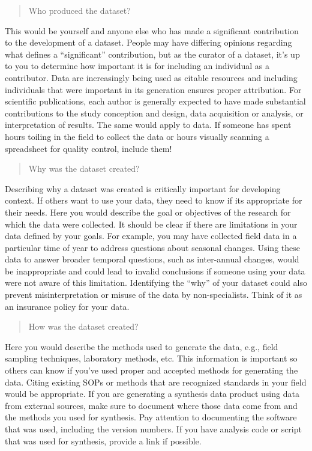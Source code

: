 \documentclass[
]{book}
\begin{document}
\begin{quote}
Who produced the dataset?
\end{quote}

This would be yourself and anyone else who has made a significant contribution to the development of a dataset. People may have differing opinions regarding what defines a ``significant'' contribution, but as the curator of a dataset, it's up to you to determine how important it is for including an individual as a contributor. Data are increasingly being used as citable resources and including individuals that were important in its generation ensures proper attribution. For scientific publications, each author is generally expected to have made substantial contributions to the study conception and design, data acquisition or analysis, or interpretation of results. The same would apply to data. If someone has spent hours toiling in the field to collect the data or hours visually scanning a spreadsheet for quality control, include them!

\begin{quote}
Why was the dataset created?
\end{quote}

Describing why a dataset was created is critically important for developing context. If others want to use your data, they need to know if its appropriate for their needs. Here you would describe the goal or objectives of the research for which the data were collected. It should be clear if there are limitations in your data defined by your goals. For example, you may have collected field data in a particular time of year to address questions about seasonal changes. Using these data to answer broader temporal questions, such as inter-annual changes, would be inappropriate and could lead to invalid conclusions if someone using your data were not aware of this limitation. Identifying the ``why'' of your dataset could also prevent misinterpretation or misuse of the data by non-specialists. Think of it as an insurance policy for your data.

\begin{quote}
How was the dataset created?
\end{quote}

Here you would describe the methods used to generate the data, e.g., field sampling techniques, laboratory methods, etc. This information is important so others can know if you've used proper and accepted methods for generating the data. Citing existing SOPs or methods that are recognized standards in your field would be appropriate. If you are generating a synthesis data product using data from external sources, make sure to document where those data come from and the methods you used for synthesis. Pay attention to documenting the software that was used, including the version numbers. If you have analysis code or script that was used for synthesis, provide a link if possible.
\end{document}
